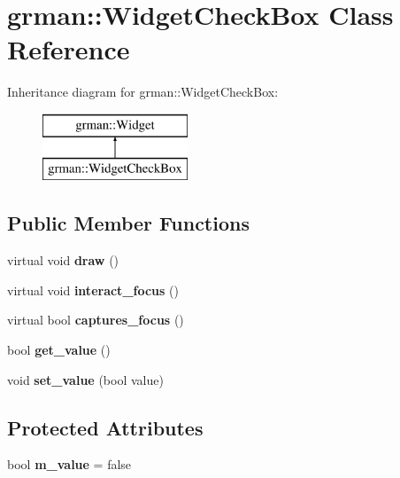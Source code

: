 \hypertarget{classgrman_1_1_widget_check_box}{}\section{grman\+:\+:Widget\+Check\+Box Class Reference}
\label{classgrman_1_1_widget_check_box}
Inheritance diagram for grman\+:\+:Widget\+Check\+Box\+:\begin{figure}[H]
\begin{center}
\leavevmode
\includegraphics[height=2.000000cm]{classgrman_1_1_widget_check_box}
\end{center}
\end{figure}
\subsection*{Public Member Functions}
\begin{DoxyCompactItemize}
\item 
\mbox{\label{classgrman_1_1_widget_check_box_af935c38c495fb97868712b0eefe6a314}} 
virtual void {\bfseries draw} ()
\item 
\mbox{\label{classgrman_1_1_widget_check_box_a14adf9ff412d2fa9ce5c52cbe4322945}} 
virtual void {\bfseries interact\+\_\+focus} ()
\item 
\mbox{\label{classgrman_1_1_widget_check_box_a5b87e7f1073c4a189dff42d18db3c87f}} 
virtual bool {\bfseries captures\+\_\+focus} ()
\item 
\mbox{\label{classgrman_1_1_widget_check_box_ab591b2df3943adde9318dd6db25ca845}} 
bool {\bfseries get\+\_\+value} ()
\item 
\mbox{\label{classgrman_1_1_widget_check_box_ad5236c112a398d2d2c17360dc4f76f4b}} 
void {\bfseries set\+\_\+value} (bool value)
\end{DoxyCompactItemize}
\subsection*{Protected Attributes}
\begin{DoxyCompactItemize}
\item 
\mbox{\label{classgrman_1_1_widget_check_box_ae430ada493e002e9c91b458f3ffa9678}} 
bool {\bfseries m\+\_\+value} = false
\end{DoxyCompactItemize}


